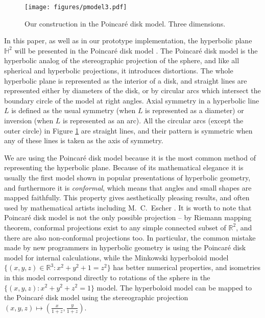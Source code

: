\documentclass{article}
\begin{document}
\def\svgwidth{\linewidth}
\begin{figure}
\def\myfont#1#2{{\fontsize{100}{150}#2}}
\texttt{[image: figures/pmodel3.pdf]}
\caption{Our construction in the Poincar\'e disk model. Three dimensions.\label{pmodel}}
\end{figure}

In this paper, as well as in our prototype implementation, the hyperbolic plane $\mathbb{H}^2$ will
be presented in the Poincar\'e disk model \cite{cannon}. The Poincar\'e disk model is the hyperbolic analog of the
stereographic projection of the sphere, and like all spherical and hyperbolic projections,
it introduces distortions. The whole hyperbolic plane is represented as the interior of
a disk, and straight lines are represented either by diameters of the disk, or by
circular arcs which intersect the boundary circle of the model at right angles.
Axial symmetry in a hyperbolic line $L$ is defined as the usual symmetry (when $L$ is
represented as a diameter) or inversion (when $L$ is represented as an arc). All the circular
arcs (except the outer circle) in Figure \ref{pmodel} are straight lines, and their pattern
is symmetric when any of these lines is taken as the axis of symmetry. 

We are using the Poincar\'e disk model because it is the most common method of
representing the hyperbolic plane. Because of its mathematical elegance it is usually
the first model shown in popular presentations of hyperbolic geometry, and furthermore it is
\emph{conformal}, which means that angles and small shapes are mapped faithfully.
This property gives aesthetically pleasing results, and often used by mathematical
artists including M.~C.~Escher \cite{coxe41}. It is worth to note that Poincar\'e disk
model is not the only possible projection -- by Riemann mapping theorem, conformal projections
exist to any simple connected subset of $\mathbb{R}^2$, and there are also non-conformal
projections too. In particular, the common mistake made by new programmers in hyperbolic
geometry is using the Poincar\'e disk model for internal calculations, while the Minkowski
hyperboloid model $\{(x,y,z) \in \mathbb{R}^3: x^2+y^2+1=z^2\}$ has better numerical properties,
and isometries in this model correspond directly to rotations of the sphere in the
$\{(x,y,z): x^2+y^2+z^2=1\}$ model. The hyperboloid model can be mapped to the Poincar\'e disk
model using the stereographic projection $(x,y,z) \mapsto (\frac{x}{1+z}, \frac{y}{1+z})$.
\end{document}
